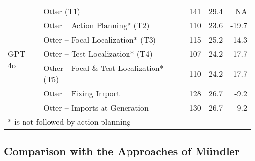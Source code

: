 \begin{table}[t]
{\begin{tabular}{llrrr}
\multirow{7}{*}{GPT-4o}        & Otter (T1)                                 & 141                                    & 29.4                         & NA                                                                                   \\
                               & Otter -- Action Planning* (T2)              & 110                                    & 23.6                         & -19.7                                                                                \\
                               & Otter -- Focal Localization* (T3)          & 115                                    & 25.2                         & -14.3                                                                                \\
                               & Otter -- Test Localization* (T4)            & 107                                    & 24.2                         & -17.7                                                                                \\
                               & Other -  Focal \& Test Localization* (T5)  & 110                                    & 24.2                         & -17.7                                                                                \\
                               & Otter -- Fixing Import                & 128                                    & 26.7                         & -9.2                                                                                 \\
                               & Otter -- Imports at Generation        & 130                                    & 26.7                         & -9.2         \\ \bottomrule        
                               \multicolumn{4}{l}{* is not followed by action planning}                                                                   
\end{tabular}}
\label{tbl:ablation}
\end{table}



\subsection{Comparison with the Approaches of M{\"u}ndler \etal}
\label{sec:rq3}

